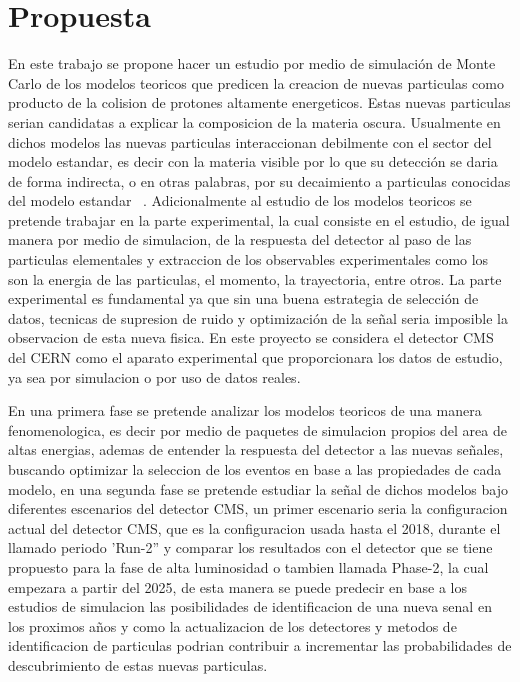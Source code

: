 \chapter{Propuesta}

En este trabajo se propone hacer un estudio por medio de simulaci\'on de Monte Carlo de los modelos teoricos que predicen la creacion de nuevas particulas como producto de la colision de protones altamente energeticos. Estas nuevas particulas serian candidatas a explicar la composicion de la materia oscura.  Usualmente en dichos modelos las nuevas particulas interaccionan debilmente con el sector del modelo estandar, es decir con la materia visible por lo que su detecci\'on se daria de forma indirecta, o en otras palabras, por su decaimiento a particulas conocidas del modelo estandar~\cite{Curtin2015} .  Adicionalmente al estudio de los modelos teoricos se pretende trabajar en la parte experimental, la cual consiste en el estudio, de igual manera por medio de simulacion, de la respuesta del detector al paso de las particulas elementales y extraccion de los observables experimentales como los son la energia de las particulas, el momento, la trayectoria, entre otros.  La parte experimental es fundamental ya que sin una buena estrategia de selecci\'on de datos, tecnicas de supresion de ruido y optimizaci\'on de la se\~nal seria imposible la observacion de esta nueva fisica. En este proyecto se considera el detector CMS del CERN como el aparato experimental que proporcionara los datos de estudio, ya sea por simulacion o por uso de datos reales.  

En una primera fase se pretende analizar los modelos teoricos de una manera fenomenologica, es decir por medio de paquetes de simulacion propios del area de altas energias, ademas de entender la respuesta del detector a las nuevas se\~nales, buscando optimizar la seleccion de los eventos en base a las propiedades de cada modelo, en una segunda fase se pretende estudiar la se\~nal de dichos modelos bajo diferentes escenarios del detector CMS, un primer escenario seria la configuracion actual del detector CMS, que es la configuracion usada hasta el 2018, durante el llamado periodo 'Run-2'' y comparar los resultados con el detector que se tiene propuesto para la fase de alta luminosidad o tambien llamada Phase-2, la cual empezara  a partir del 2025, de esta manera se puede predecir en base a los estudios de simulacion las posibilidades de identificacion de una nueva senal en los proximos a\~nos y como la actualizacion de los detectores y metodos de identificacion de particulas podrian contribuir a incrementar las probabilidades de descubrimiento de estas nuevas particulas. 


